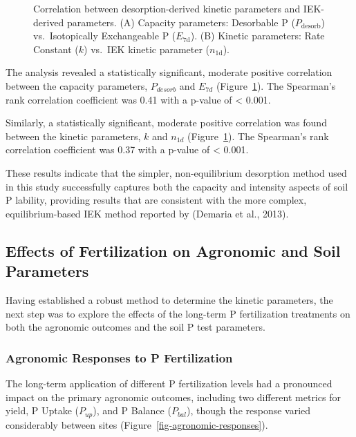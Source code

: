 \documentclass[
  a4paper,
]{article}
\begin{document}
\begin{figure}
\begin{minipage}{0.50\linewidth}
{}


\end{minipage}%

\caption{\label{fig-iek-comparison}Correlation between
desorption-derived kinetic parameters and IEK-derived parameters. (A)
Capacity parameters: Desorbable P (\(P_{\text{desorb}}\))
vs.~Isotopically Exchangeable P (\(E_{\text{7d}}\)). (B) Kinetic
parameters: Rate Constant (\(k\)) vs.~IEK kinetic parameter
(\(n_{\text{1d}}\)).}

\end{figure}%

The analysis revealed a statistically significant, moderate positive
correlation between the capacity parameters, \(P_{desorb}\) and
\(E_{7d}\) (Figure~\ref{fig-iek-comparison}). The Spearman's rank
correlation coefficient was 0.41 with a p-value of \textless{} 0.001.

Similarly, a statistically significant, moderate positive correlation
was found between the kinetic parameters, \(k\) and \(n_{1d}\)
(Figure~\ref{fig-iek-comparison}). The Spearman's rank correlation
coefficient was 0.37 with a p-value of \textless{} 0.001.

These results indicate that the simpler, non-equilibrium desorption
method used in this study successfully captures both the capacity and
intensity aspects of soil P lability, providing results that are
consistent with the more complex, equilibrium-based IEK method reported
by (Demaria et al., 2013).

\subsection{Effects of Fertilization on Agronomic and Soil
Parameters}\label{sec-effects-of-fertilization-on-agronomic-and-soil-parameters}

Having established a robust method to determine the kinetic parameters,
the next step was to explore the effects of the long-term P
fertilization treatments on both the agronomic outcomes and the soil P
test parameters.

\subsubsection{Agronomic Responses to P
Fertilization}\label{sec-agronomic-responses-to-p-fertilization}

The long-term application of different P fertilization levels had a
pronounced impact on the primary agronomic outcomes, including two
different metrics for yield, P Uptake (\(P_{up}\)), and P Balance
(\(P_{bal}\)), though the response varied considerably between sites
(Figure~\ref{fig-agronomic-responses}).
\end{document}

